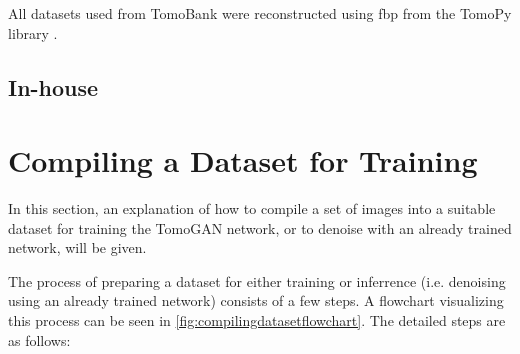 All datasets used from TomoBank were reconstructed using \acrshort{fbp} from the TomoPy library \cite{tomopy}. 


\subsection{In-house}

\section{Compiling a Dataset for Training}
\label{sec:method:compilingdataset}
In this section, an explanation of how to compile a set of images into a suitable dataset for training the TomoGAN network, or to denoise with an already trained network, will be given. 

The process of preparing a dataset for either training or inferrence (i.e. denoising using an already trained network) consists of a few steps. A flowchart visualizing this process can be seen in \cref{fig:compilingdatasetflowchart}. The detailed steps are as follows:

